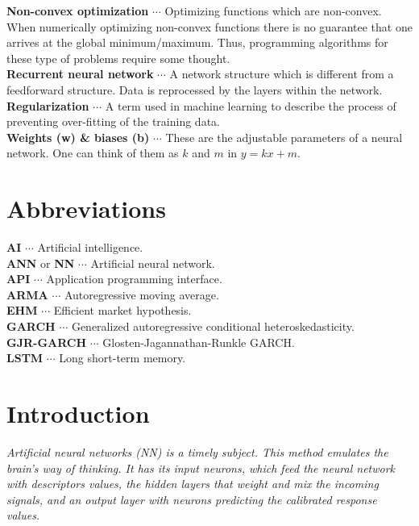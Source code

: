 \documentclass[12pt, letterpaper]{amsart}%
\begin{document}
\noindent
\textbf{Non-convex optimization} $\cdots$ Optimizing functions which are non-convex. When numerically optimizing non-convex functions there is no guarantee that one arrives at the global minimum/maximum. Thus, programming algorithms for these type of problems require some thought.
\\

\noindent
\textbf{Recurrent neural network} $\cdots$ A network structure which is different from a feedforward structure. Data is reprocessed by the layers within the network.
\\

\noindent
\textbf{Regularization} $\cdots$ A term used in machine learning to describe the process of preventing over-fitting of the training data.
\\

\noindent
\textbf{Weights (w) \& biases (b)} $\cdots$ These are the adjustable parameters of a neural network. One can think of them as $k$ and $m$ in $y = kx+m$.

\newpage

\section*{Abbreviations}
\noindent
\textbf{AI} $\cdots$ Artificial intelligence.
\\

\noindent
\textbf{ANN} or \textbf{NN} $\cdots$ Artificial neural network.
\\

\noindent
\textbf{API} $\cdots$ Application programming interface.
\\

\noindent
\textbf{ARMA} $\cdots$ Autoregressive moving average.
\\

\noindent
\textbf{EHM} $\cdots$ Efficient market hypothesis.
\\

\noindent
\textbf{GARCH} $\cdots$ Generalized autoregressive conditional heteroskedasticity.
\\

\noindent
\textbf{GJR-GARCH} $\cdots$ Glosten-Jagannathan-Runkle GARCH.
\\

\noindent
\textbf{LSTM} $\cdots$ Long short-term memory.

\newpage

\section{Introduction}
\begin{displayquote}
\textit{Artificial neural networks (NN) is a timely subject. This method emulates the brain's way of thinking. It has its input neurons, which feed the neural network with descriptors values, the hidden layers that weight and mix the incoming signals, and an output layer with neurons predicting the calibrated response values.}
\end{displayquote}
\vspace{0.5cm}
\end{document}

